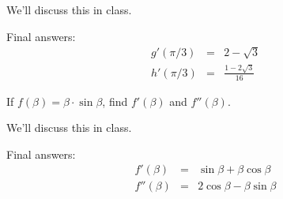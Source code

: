 \documentclass[12pt,addpoints, answers, fleqn]{exam}
\begin{document}
\begin{questions}
\begin{solution}
We'll discuss this in class.

Final answers:
\begin{eqnarray*}
g'\left( \pi / 3 \right) &=& 2 - \sqrt{3}\\
h'\left( \pi / 3 \right) &=& \frac{1 - 2\sqrt{3} }{16}
\end{eqnarray*}

\end{solution}

\question If $f\left( \beta \right) = \beta \cdot \sin \beta$, find $f'\left( \beta \right)$ and $f''\left( \beta \right)$.

\begin{solution}
We'll discuss this in class.

Final answers:
\begin{eqnarray*}
f'\left( \beta \right) &=& \sin \beta + \beta  \cos \beta\\
f''\left( \beta \right) &=& 2  \cos \beta - \beta  \sin \beta
\end{eqnarray*}
\end{solution}



\end{questions}
\end{document}
